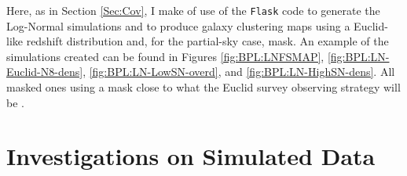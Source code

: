 \qquad Here, as in Section \ref{Sec:Cov}, I make of use of the \texttt{Flask} code to generate the Log-Normal simulations \citep{Flask2016} and to produce galaxy clustering maps using a Euclid-like redshift distribution and, for the partial-sky case, mask. An example of the simulations created can be found in Figures \ref{fig:BPL:LNFSMAP},  \ref{fig:BPL:LN-Euclid-N8-dens}, \ref{fig:BPL:LN-LowSN-overd}, and \ref{fig:BPL:LN-HighSN-dens}. All masked ones using a mask  close to what the Euclid survey observing strategy will be \citep{2011EuclidRedPaper}. %


\section{Investigations on Simulated Data}\label{Sec:BPL:Investigations}
